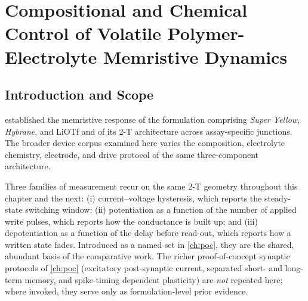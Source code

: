 \documentclass[12pt, twoside]{report}
\begin{document}
  \setcounter{chapter}{3}     %
\fi

\providecommand{\SY}{\textit{Super Yellow}}
\providecommand{\Hybrane}{\textit{Hybrane}}
\providecommand{\PEO}{PEO}
\providecommand{\TMPE}{TMPE}
\providecommand{\LiTf}{LiOTf}
\providecommand{\NaTf}{NaOTf}
\providecommand{\KTf}{KOTf}
\providecommand{\TFSI}{TFSI}
\providecommand{\ITO}{ITO}
\providecommand{\twoterminal}{two-terminal}
\providecommand{\siCompRef}[1]{\ifdefined\thesismode\cref{#1}\else Appendix~C\fi}

\chapter{Compositional and Chemical Control of Volatile Polymer-Electrolyte Memristive Dynamics}\label{ch:comparative}

\section{Introduction and Scope}\label{sec:ch4_intro}

 established the memristive response of the formulation comprising \SY{}, \Hybrane{}, and \LiTf{} and of its 2-T architecture across assay-specific junctions. The broader device corpus examined here varies the composition, electrolyte chemistry, electrode, and drive protocol of the same three-component architecture.

Three families of measurement recur on the same 2-T geometry throughout this chapter and the next: (i) current--voltage hysteresis, which reports the steady-state switching window; (ii) potentiation as a function of the number of applied write pulses, which reports how the conductance is built up; and (iii) depotentiation as a function of the delay before read-out, which reports how a written state fades. Introduced as a named set in \cref{ch:poc}, they are the shared, abundant basis of the comparative work. The richer proof-of-concept synaptic protocols of \cref{ch:poc} (excitatory post-synaptic current, separated short- and long-term memory, and spike-timing dependent plasticity) are \emph{not} repeated here; where invoked, they serve only as formulation-level prior evidence.
\end{document}
